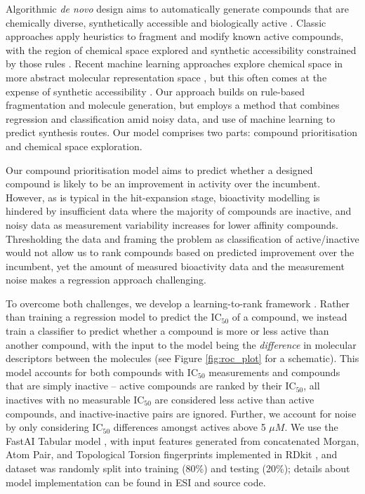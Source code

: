 \documentclass[twoside,twocolumn,9pt]{article}
\begin{document}
Algorithmic \emph{de novo} design aims to automatically generate compounds that are chemically diverse, synthetically accessible and biologically active \cite{schneider2016novo}. Classic approaches apply heuristics to fragment and modify known active compounds, with the region of chemical space explored and synthetic accessibility constrained by those rules \cite{brown2004graph,patel2009knowledge,hartenfeller2012dogs}. Recent machine learning approaches explore chemical space in more abstract molecular representation space \cite{gomez2018automatic,segler2018generating}, but this often comes at the expense of synthetic accessibility \cite{gao2020synthesizability}. Our approach builds on rule-based fragmentation and molecule generation, but employs a method that combines regression and classification amid noisy data, and use of machine learning to predict synthesis routes. Our model comprises two parts: compound prioritisation and chemical space exploration. 

Our compound prioritisation model aims to predict whether a designed compound is likely to be an improvement in activity over the incumbent. However, as is typical in the hit-expansion stage, bioactivity modelling is hindered by insufficient data where the majority of compounds are inactive, and noisy data as measurement variability increases for lower affinity compounds. Thresholding the data and framing the problem as classification of active/inactive would not allow us to rank compounds based on predicted improvement over the incumbent, yet the amount of measured bioactivity data and the measurement noise  makes a regression approach challenging.


To overcome both challenges, we develop a learning-to-rank framework \cite{duffy2010molecular,agarwal2010ranking}. Rather than training a regression model to predict the $\mathrm{IC}_{50}$ of a compound, we instead train a classifier to predict whether a compound is more or less active than another compound, with the input to the model being the \emph{difference} in molecular descriptors between the molecules (see Figure \ref{fig:roc_plot} for a schematic). This model accounts for both compounds with $\mathrm{IC}_{50}$ measurements and compounds that are simply inactive -- active compounds are ranked by their $\mathrm{IC}_{50}$, all inactives with no measurable $\mathrm{IC}_{50}$ are considered less active than active compounds, and inactive-inactive pairs are ignored. Further, we account for noise by only considering $\mathrm{IC}_{50}$ differences amongst actives above 5 $\mu M$. We use the FastAI Tabular model \cite{howard2018fastai}, with input features generated from concatenated Morgan, Atom Pair, and Topological Torsion fingerprints implemented in RDkit \cite{rdkit}, and dataset was randomly split into training (80\%) and testing (20\%); details about model implementation can be found in ESI and source code.
\end{document}
